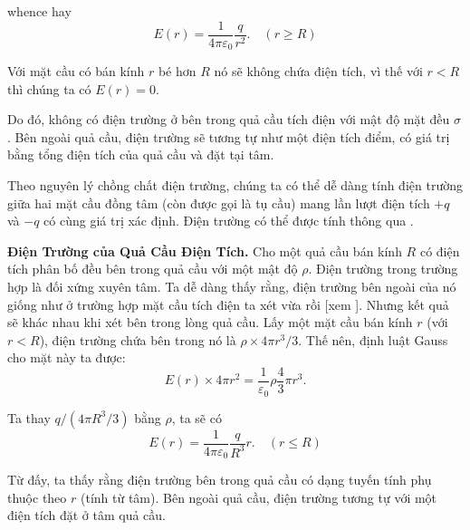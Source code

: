 \noindent
whence hay
\begin{equation}\label{eq:1_124}
	E(r) = \frac{1}{4\pi\varepsilon_0}\frac{q}{r^2}.\quad (r\geqslant R)
\end{equation}

Với mặt cầu có bán kính $r$ bé hơn $R$ nó sẽ không chứa điện tích, vì thế với $r<R$ thì chúng ta có $E(r)=0$.

Do đó, không có điện trường ở bên trong quả cầu tích điện với mật độ mặt đều $\sigma$. Bên ngoài quả cầu, điện trường sẽ tương tự như một điện tích điểm, có giá trị bằng tổng điện tích của quả cầu và đặt tại tâm.

Theo nguyên lý chồng chất điện trường, chúng ta có thể dễ dàng tính điện trường giữa hai mặt cầu đồng tâm (còn được gọi là tụ cầu) mang lần lượt điện tích $+q$ và $-q$ có cùng giá trị xác định. Điện trường có thể được tính thông qua .

\textbf{Điện Trường của Quả Cầu Điện Tích.} Cho một quả cầu bán kính $R$ có điện tích phân bố đều bên trong quả cầu với một mật độ $\rho$. Điện trường trong trường hợp là đối xứng xuyên tâm. Ta dễ dàng thấy rằng, điện trường bên ngoài của nó giống như ở trường hợp mặt cầu tích điện ta xét vừa rồi [xem ]. Nhưng kết quả sẽ khác nhau khi xét bên trong lòng quả cầu. Lấy một mặt cầu bán kính $r$ (với $r<R$), điện trường chứa bên trong nó là $\rho\times 4\pi r^3/3$. Thế nên, định luật Gauss cho mặt này ta được:
\begin{equation*}
	E(r)\times 4\pi r^2 = \frac{1}{\varepsilon_0}\rho \frac{4}{3}\pi r^3.
\end{equation*}

\noindent
Ta thay $q/(4\pi R^3/3)$ bằng $\rho$, ta sẽ có
\begin{equation}\label{eq:1_125}
	E(r) = \frac{1}{4\pi\varepsilon_0}\frac{q}{R^3}r.\quad (r\leqslant R)
\end{equation}

Từ đấy, ta thấy rằng điện trường bên trong quả cầu có dạng tuyến tính phụ thuộc theo $r$ (tính từ tâm). Bên ngoài quả cầu, điện trường tương tự với một điện tích đặt ở tâm quả cầu.
